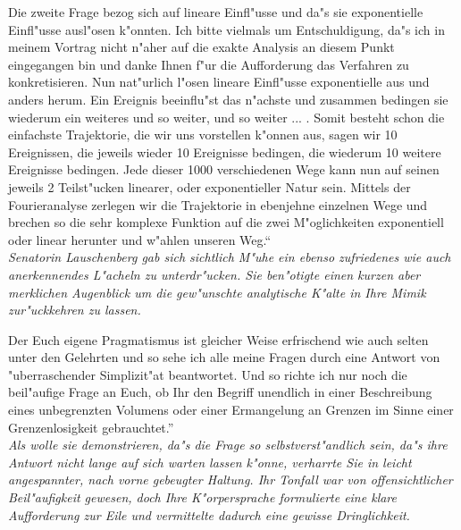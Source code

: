 \documentclass[a5paper,8pt]{book}
\begin{document}
Die zweite Frage bezog sich auf lineare Einfl"usse und da"s sie exponentielle Einfl"usse ausl"osen k"onnten. Ich bitte vielmals um Entschuldigung, da"s ich in meinem Vortrag 
nicht n"aher auf die exakte Analysis an diesem Punkt eingegangen bin und danke Ihnen f"ur die Aufforderung das Verfahren zu konkretisieren. Nun nat"urlich l"osen lineare 
Einfl"usse exponentielle aus und anders herum. Ein Ereignis beeinflu"st das n"achste und zusammen bedingen sie wiederum ein weiteres und so weiter, und so weiter ... . Somit 
besteht schon die einfachste Trajektorie, die wir uns vorstellen k"onnen aus, sagen wir 10 Ereignissen, die jeweils wieder 10 Ereignisse bedingen, die wiederum 10 weitere 
Ereignisse bedingen. Jede dieser 1000 verschiedenen Wege kann nun auf seinen jeweils 2 Teilst"ucken linearer, oder exponentieller Natur sein. Mittels der Fourieranalyse 
zerlegen wir die Trajektorie in ebenjehne einzelnen Wege und brechen so die sehr komplexe Funktion auf die zwei M"oglichkeiten exponentiell oder linear herunter und 
w"ahlen unseren Weg.``\\

\textit{Senatorin Lauschenberg gab sich sichtlich M"uhe ein ebenso zufriedenes wie auch anerkennendes L"acheln zu unterdr"ucken. Sie ben"otigte einen kurzen aber merklichen 
Augenblick um die gew"unschte analytische K"alte in Ihre Mimik zur"uckkehren zu lassen.}

\grqq Der Euch eigene Pragmatismus ist gleicher Weise erfrischend wie auch selten unter den Gelehrten und so sehe ich alle meine Fragen durch eine Antwort von "uberraschender 
Simplizit"at beantwortet.
Und so richte ich nur noch die beil"aufige Frage an Euch, ob Ihr den Begriff unendlich in einer Beschreibung eines unbegrenzten Volumens oder einer Ermangelung an Grenzen 
im Sinne einer Grenzenlosigkeit gebrauchtet.''\\

\textit{Als wolle sie demonstrieren, da"s die Frage so selbstverst"andlich sein, da"s ihre Antwort nicht lange auf sich warten lassen k"onne, verharrte Sie in leicht 
angespannter, nach vorne gebeugter Haltung. Ihr Tonfall war von offensichtlicher Beil"aufigkeit gewesen, doch Ihre K"orpersprache formulierte eine klare Aufforderung zur 
Eile und vermittelte dadurch eine gewisse Dringlichkeit. }\\
\end{document}
